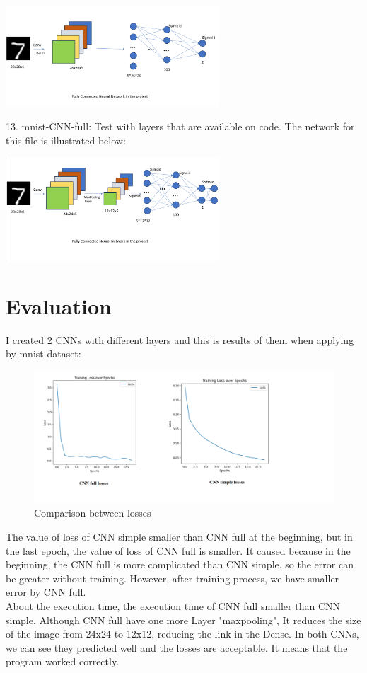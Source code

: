 \documentclass{article}
\begin{document}
\begin{center}
    \includegraphics[width=0.6\textwidth]{SimpleCNN.PNG}
\end{center}
13. mnist-CNN-full: Test with layers that are available on code. The network for this file is illustrated below:
\begin{center}
    \includegraphics[width=0.6\textwidth]{CNN_full.PNG}
\end{center}
\section{Evaluation}
I created 2 CNNs with different layers and this is results of them when applying by mnist dataset:
\begin{figure}[!ht]
    \centering
    \includegraphics[width=\linewidth]{Comparison_between_losses.png}
    \caption{Comparison between losses}
    \label{fig:comparison_losses}
\end{figure}

\vspace{0.5cm} %
The value of loss of CNN simple smaller than CNN full at the beginning, but in the last epoch, the value of loss of CNN full is smaller. It caused because in the beginning, the CNN full is more complicated than CNN simple, so the error can be greater without training. However, after training process, we have smaller error by CNN full. \\
About the execution time, the execution time of CNN full smaller than CNN simple. Although CNN full have one more Layer "maxpooling", It reduces the size of the image from 24x24 to 12x12, reducing the link in the Dense.  In both CNNs, we can see they predicted well and the losses are acceptable. It means that the program worked correctly.\\
\end{document}
